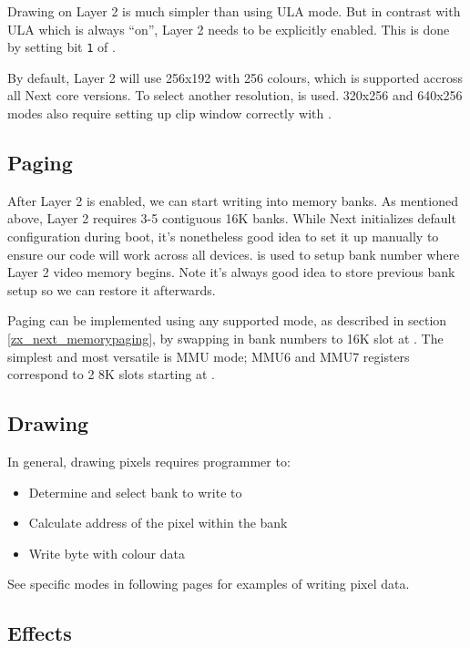 \documentclass[12pt,twoside,openright,a4paper]{book}
\begin{document}
Drawing on Layer 2 is much simpler than using ULA mode. But in contrast with ULA which is always ``on'', Layer 2 needs to be explicitly enabled. This is done by setting bit {\tt 1} of .

By default, Layer 2 will use 256x192 with 256 colours, which is supported accross all Next core versions. To select another resolution,  is used. 320x256 and 640x256 modes also require setting up clip window correctly with .


\subsection{Paging}

After Layer 2 is enabled, we can start writing into memory banks. As mentioned above, Layer 2 requires 3-5 contiguous 16K banks. While Next initializes default configuration during boot, it's nonetheless good idea to set it up manually to ensure our code will work across all devices.  is used to setup bank number where Layer 2 video memory begins. Note it's always good idea to store previous bank setup so we can restore it afterwards.

Paging can be implemented using any supported mode, as described in section \ref{zx_next_memorypaging}, by swapping in bank numbers to 16K slot at . The simplest and most versatile is MMU mode; MMU6 and MMU7 registers correspond to 2 8K slots starting at .

\pagebreak
\subsection{Drawing}

In general, drawing pixels requires programmer to:

\begin{itemize}[topsep=1pt,itemsep=1pt]
	\item Determine and select bank to write to
	\item Calculate address of the pixel within the bank
	\item Write byte with colour data
\end{itemize}

See specific modes in following pages for examples of writing pixel data.


\subsection{Effects}
\end{document}

